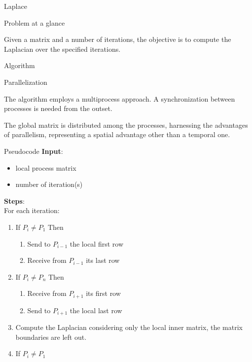 \begin{chapter}{Laplace}
    \begin{section}{Problem at a glance}
        \par Given a matrix and a number of iterations, the objective is to compute the Laplacian over the specified iterations.
    \end{section}
    \begin{section}{Algorithm}
        \begin{subsection}{Parallelization}
            \par The algorithm employs a multiprocess approach. A synchronization between processes is needed from the outset.
            \par The global matrix is distributed among the processes, harnessing the advantages of parallelism, representing a spatial advantage other than a temporal one.
        \end{subsection}
        \begin{subsection}{Pseudocode}
            \textbf{Input}:
            \begin{itemize}
                \item local process matrix
                \item number of iteration(s)
            \end{itemize}
            \textbf{Steps}:\\
            For each iteration:
            \begin{enumerate}
                \item If $P_i \neq P_1$ Then
                \begin{enumerate}
                    \item Send to $P_{i-1}$ the local first row
                    \item Receive from $P_{i-1}$ its last row
                \end{enumerate}
                \item If $P_i \neq P_n$ Then
                \begin{enumerate}
                    \item Receive from $P_{i+1}$ its first row
                    \item Send to $P_{i+1}$ the local last row
                \end{enumerate}
                \item Compute the Laplacian considering only the local inner matrix, the matrix boundaries are left out.
                \item If $P_i \neq P_1$

\end{enumerate}
\end{subsection}
\end{section}
\end{chapter}
